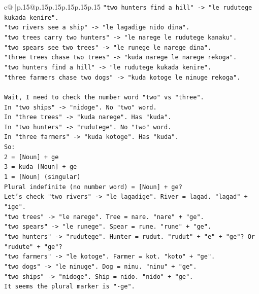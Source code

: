 \documentclass{article}
\begin{document}
{\begin{supertabular}{c@{$\;$}|p{.15\linewidth}@{}p{.15\linewidth}p{.15\linewidth}p{.15\linewidth}p{.15\linewidth}p{.15\linewidth}}
{{{\texttt{"two hunters find a hill" {-}> "le rudutege kukada kenire".} \\
\texttt{"two rivers see a ship" {-}> "le lagadige nido dina".} \\
\texttt{"two trees carry two hunters" {-}> "le narege le rudutege kanaku".} \\
\texttt{"two spears see two trees" {-}> "le runege le narege dina".} \\
\texttt{"three trees chase two trees" {-}> "kuda narege le narege rekoga".} \\
\texttt{"two hunters find a hill" {-}> "le rudutege kukada kenire".} \\
\texttt{"three farmers chase two dogs" {-}> "kuda kotoge le ninuge rekoga".} \\
\\ 
\texttt{Wait, I need to check the number word "two" vs "three".} \\
\texttt{In "two ships" {-}> "nidoge". No "two" word.} \\
\texttt{In "three trees" {-}> "kuda narege". Has "kuda".} \\
\texttt{In "two hunters" {-}> "rudutege". No "two" word.} \\
\texttt{In "three farmers" {-}> "kuda kotoge". Has "kuda".} \\
\texttt{So:} \\
\texttt{2 = {[}Noun{]} + ge} \\
\texttt{3 = kuda {[}Noun{]} + ge} \\
\texttt{1 = {[}Noun{]} (singular)} \\
\texttt{Plural indefinite (no number word) = {[}Noun{]} + ge?} \\
\texttt{Let's check "two rivers" {-}> "le lagadige". River = lagad. "lagad" + "ige".} \\
\texttt{"two trees" {-}> "le narege". Tree = nare. "nare" + "ge".} \\
\texttt{"two spears" {-}> "le runege". Spear = rune. "rune" + "ge".} \\
\texttt{"two hunters" {-}> "rudutege". Hunter = rudut. "rudut" + "e" + "ge"? Or "rudute" + "ge"?} \\
\texttt{"two farmers" {-}> "le kotoge". Farmer = kot. "koto" + "ge".} \\
\texttt{"two dogs" {-}> "le ninuge". Dog = ninu. "ninu" + "ge".} \\
\texttt{"two ships" {-}> "nidoge". Ship = nido. "nido" + "ge".} \\
\texttt{It seems the plural marker is "{-}ge".} \\
}}}
\end{supertabular}}
\end{document}
